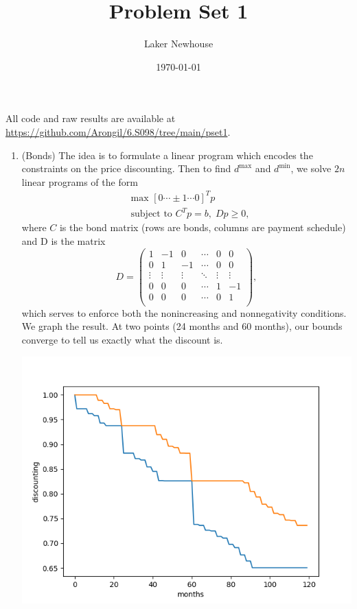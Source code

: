 \documentclass{article}
\title{Problem Set 1}
\author{Laker Newhouse}
\date{\today}
\begin{document}
\maketitle	

All code and raw results are available at \url{https://github.com/Arongil/6.S098/tree/main/pset1}.
\begin{enumerate}
    \item (Bonds) The idea is to formulate a linear program which encodes the constraints on the price discounting. Then to find $d^\text{max}$ and $d^\text{min}$, we solve $2n$ linear programs of the form \begin{align*}
        & \text{max } [0 \cdots \pm 1 \cdots 0]^T p \\
        & \text{subject to } C^T p = b, \; Dp \geq 0,
    \end{align*} where $C$ is the bond matrix (rows are bonds, columns are payment schedule) and D is the matrix \[
        D = \begin{pmatrix}
            1 & -1 & 0 & \cdots & 0 & 0 \\
            0 & 1 & -1 & \cdots & 0 & 0 \\
            \vdots & \vdots & \vdots & \ddots & \vdots & \vdots \\
            0 & 0 & 0 & \cdots & 1 & -1 \\
            0 & 0 & 0 & \cdots & 0 & 1 \\
        \end{pmatrix},
    \] which serves to enforce both the nonincreasing and nonnegativity conditions. We graph the result. At two points (24 months and 60 months), our bounds converge to tell us exactly what the discount is.
    
    \begin{center}
    	\includegraphics[scale=0.5]{p1_plot}
    \end{center}
    

\end{enumerate}
\end{document}
